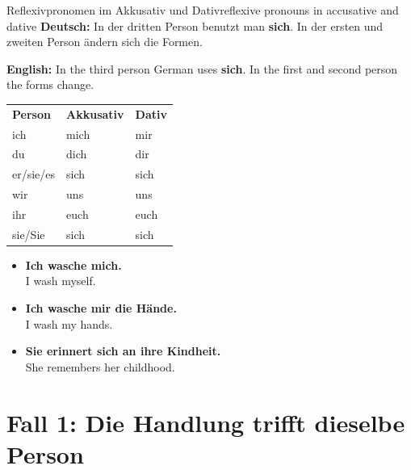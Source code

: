 \documentclass[a4paper,11pt]{article}
\newcommand{\GermanText}[1]{\textbf{Deutsch: }#1\par}
\newcommand{\EnglishText}[1]{{\small\color{SoftGray}\textbf{English: }#1\par}}
\newcommand{\ExampleItem}[2]{\item \textbf{#1}\\{\small\color{SoftGray}#2}}
\newcommand{\HeaderCell}[1]{\cellcolor{HeaderBlueDark}\color{white}\bfseries #1}
\begin{document}
        \begin{grammarentry}{Reflexivpronomen im Akkusativ und Dativ}{reflexive pronouns in accusative and dative}
            \GermanText{In der dritten Person benutzt man \textbf{sich}. In der ersten und zweiten Person ändern sich die Formen.}
            \EnglishText{In the third person German uses \textbf{sich}. In the first and second person the forms change.}
            
            \begin{longtable}{>{\raggedright\arraybackslash}p{}>{\raggedright\arraybackslash}p{}>{\raggedright\arraybackslash}p{}}
                \HeaderCell{Person} & \HeaderCell{Akkusativ} & \HeaderCell{Dativ} \\
                ich & mich & mir \\
                du & dich & dir \\
                er/sie/es & sich & sich \\
                wir & uns & uns \\
                ihr & euch & euch \\
                sie/Sie & sich & sich \\
            \end{longtable}
            
            \begin{exbox}
                \begin{itemize}
                    \ExampleItem{Ich wasche mich.}{I wash myself.}
                    \ExampleItem{Ich wasche mir die Hände.}{I wash my hands.}
                    \ExampleItem{Sie erinnert sich an ihre Kindheit.}{She remembers her childhood.}
                \end{itemize}
            \end{exbox}
        \end{grammarentry}
    
    
    \section{Fall 1: Die Handlung trifft dieselbe Person}
        
\end{document}
